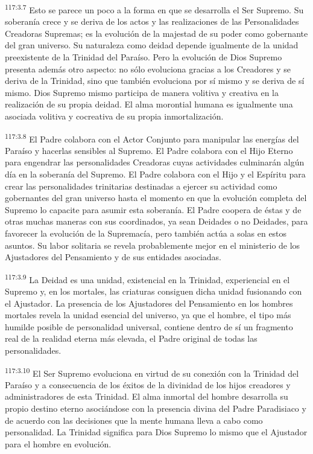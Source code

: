 \par
\textsuperscript{117:3.7} Esto se parece un poco a la forma en que se desarrolla el Ser Supremo. Su soberanía crece y se deriva de los actos y las realizaciones de las Personalidades Creadoras Supremas; es la evolución de la majestad de su poder como gobernante del gran universo. Su naturaleza como deidad depende igualmente de la unidad preexistente de la Trinidad del Paraíso. Pero la evolución de Dios Supremo presenta además otro aspecto: no sólo evoluciona gracias a los Creadores y se deriva de la Trinidad, sino que también evoluciona por sí mismo y se deriva de sí mismo. Dios Supremo mismo participa de manera volitiva y creativa en la realización de su propia deidad. El alma morontial humana es igualmente una asociada volitiva y cocreativa de su propia inmortalización.

\par
\textsuperscript{117:3.8} El Padre colabora con el Actor Conjunto para manipular las energías del Paraíso y hacerlas sensibles al Supremo. El Padre colabora con el Hijo Eterno para engendrar las personalidades Creadoras cuyas actividades culminarán algún día en la soberanía del Supremo. El Padre colabora con el Hijo y el Espíritu para crear las personalidades trinitarias destinadas a ejercer su actividad como gobernantes del gran universo hasta el momento en que la evolución completa del Supremo lo capacite para asumir esta soberanía. El Padre coopera de éstas y de otras muchas maneras con sus coordinados, ya sean Deidades o no Deidades, para favorecer la evolución de la Supremacía, pero también actúa a solas en estos asuntos. Su labor solitaria se revela probablemente mejor en el ministerio de los Ajustadores del Pensamiento y de sus entidades asociadas.

\par
\textsuperscript{117:3.9} La Deidad es una unidad, existencial en la Trinidad, experiencial en el Supremo y, en los mortales, las criaturas consiguen dicha unidad fusionando con el Ajustador. La presencia de los Ajustadores del Pensamiento en los hombres mortales revela la unidad esencial del universo, ya que el hombre, el tipo más humilde posible de personalidad universal, contiene dentro de sí un fragmento real de la realidad eterna más elevada, el Padre original de todas las personalidades.

\par
\textsuperscript{117:3.10} El Ser Supremo evoluciona en virtud de su conexión con la Trinidad del Paraíso y a consecuencia de los éxitos de la divinidad de los hijos creadores y administradores de esta Trinidad. El alma inmortal del hombre desarrolla su propio destino eterno asociándose con la presencia divina del Padre Paradisiaco y de acuerdo con las decisiones que la mente humana lleva a cabo como personalidad. La Trinidad significa para Dios Supremo lo mismo que el Ajustador para el hombre en evolución.

